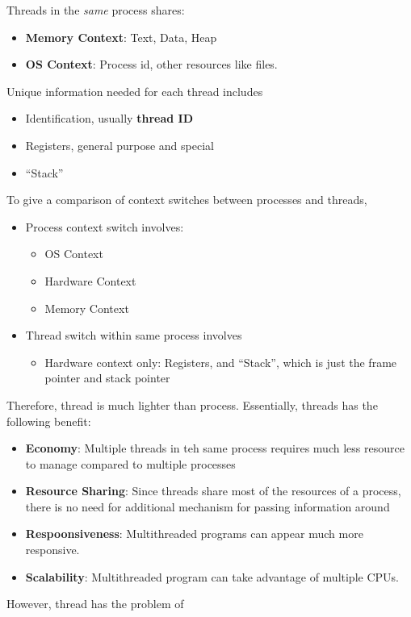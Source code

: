 \documentclass[11pt]{article}
\theoremstyle{definition}
\begin{document}
Threads in the \textit{same} process shares:
\begin{itemize}[itemsep=0pt]
  \item \textbf{Memory Context}: Text, Data, Heap
  \item \textbf{OS Context}: Process id, other resources like files.
\end{itemize}
Unique information needed for each thread includes
\begin{itemize}[itemsep=0pt]
  \item Identification, usually \textbf{thread ID}
  \item Registers, general purpose and special
  \item ``Stack''
\end{itemize}
To give a comparison of context switches between processes and threads, 
\begin{itemize}[itemsep=0pt]
  \item Process context switch involves:
  \begin{itemize}[itemsep=0pt]
    \item OS Context
    \item Hardware Context
    \item Memory Context
  \end{itemize}
  \item Thread switch within same process involves
  \begin{itemize}[itemsep=0pt]
    \item Hardware context only: Registers, and ``Stack'', which is just the frame pointer and stack pointer
  \end{itemize}
\end{itemize}
Therefore, thread is much lighter than process. Essentially, threads has the following benefit:
\begin{itemize}[itemsep=0pt]
  \item \textbf{Economy}: Multiple threads in teh same process requires much less resource to manage compared to multiple processes
  \item \textbf{Resource Sharing}: Since threads share most of the resources of a process, there is no need for additional mechanism for passing information around
  \item \textbf{Respoonsiveness}: Multithreaded programs can appear much more responsive.
  \item \textbf{Scalability}: Multithreaded program can take advantage of multiple CPUs.
\end{itemize}
However, thread has the problem of
\end{document}
